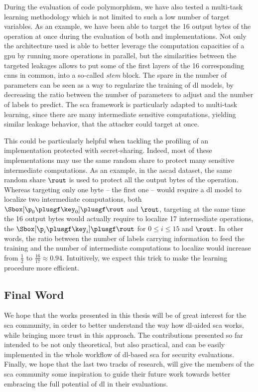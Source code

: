 		During the evaluation of code polymorphism, we have also tested a multi-task learning methodology which is not limited to such a low number of target variables.
		As an example, we have been able to target the 16 output bytes of the \ark{} operation at once during the evaluation of both \mbedTLS{} and \aeshuitbit{} implementations.
		Not only the architecture used is able to better leverage the computation capacities of a \gls{gpu} by running more operations in parallel, but the similarities between the targeted leakages allows to put some of the first layers of the 16 corresponding \glspl{cnn} in common, into a so-called \emph{stem} block.
		The spare in the number of parameters can be seen as a way to regularize the training of \gls{dl} models, by decreasing the ratio between the number of parameters to adjust and the number of labels to predict.
		The \gls{sca} framework is particularly adapted to multi-task learning, since there are many intermediate sensitive computations, yielding similar leakage behavior, that the attacker could target at once.

		This could be particularly helpful when tackling the profiling of an implementation protected with secret-sharing.
		Indeed, most of these implementations may use the same random share to protect many sensitive intermediate computations.
		As an example, in the \gls{ascad} dataset, the same random share \(\rout\) is used to protect all the output bytes of the \sub{} operation.
		Whereas targeting only one byte -- \eg{} the first one -- would require a \gls{dl} model to localize two intermediate computations, \ie{} both \(\Sbox[\p_0 \plusgf \key_0] \plusgf \rout\) and \(\rout\), targeting at the same time the 16 output bytes would actually require to localize 17 intermediate operations, \ie{} the \(\Sbox[\p_i \plusgf \key_i] \plusgf \rout\) for \(0 \leq i \leq 15\) and \(\rout\).
		In other words, the ratio between the number of labels carrying information to feed the training and the number of intermediate computations to localize would increase from \(\frac{1}{2}\) to \(\frac{16}{17} \approx 0.94\).
		Intuitively, we expect this trick to make the learning procedure more efficient.


	\subsection{Final Word}
		We hope that the works presented in this thesis will be of great interest for the \gls{sca} community, in order to better understand the way how \gls{dl}-aided \gls{sca} works, while bringing more trust in this approach.
		The contributions presented so far intended to be not only theoretical, but also practical, and can be easily implemented in the whole workflow of \gls{dl}-based \gls{sca} for security evaluations.
		Finally, we hope that the last two tracks of research, will give the members of the \gls{sca} community some inspiration to guide their future work towards better embracing the full potential of \gls{dl} in their evaluations.